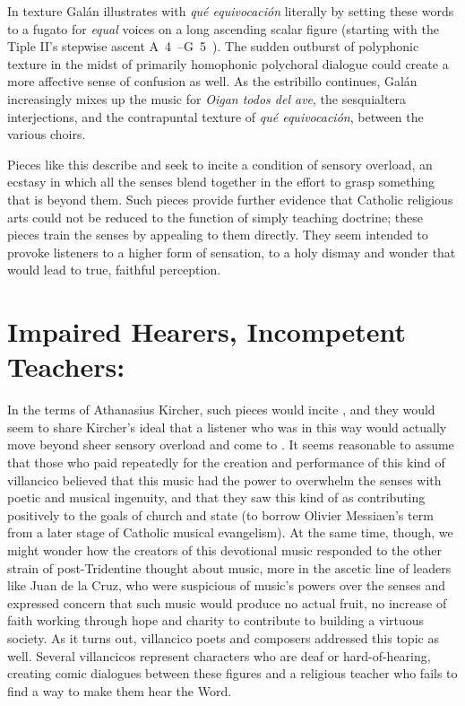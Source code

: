 \label{fig:Galan-Oigan-coloratio}
In texture Galán illustrates with \emph{qué equivocación} literally by setting these words to a fugato for \emph{equal} voices on a long ascending scalar figure (starting with the Tiple II's stepwise ascent A~4~--G~5~).
The sudden outburst of polyphonic texture in the midst of primarily homophonic polychoral dialogue could create a more affective sense of confusion as well.
As the estribillo continues, Galán increasingly mixes up the music for \emph{Oigan todos del ave}, the sesquialtera interjections, and the contrapuntal texture of \emph{qué equivocación}, between the various choirs.

Pieces like this describe and seek to incite a condition of sensory overload, an ecstasy in which all the senses blend together in the effort to grasp something that is beyond them.
Such pieces provide further evidence that Catholic religious arts could not be reduced to the function of simply teaching doctrine; these pieces train the senses by appealing to them directly.
They seem intended to provoke listeners to a higher form of sensation, to a holy dismay and wonder that would lead to true, faithful perception.


\section{Impaired Hearers, Incompetent Teachers: }

In the terms of Athanasius Kircher, such pieces would incite , and they would seem to share Kircher's ideal that a listener who was  in this way would actually move beyond sheer sensory overload and come to .
\Autocite[bk.~7, p.~550]{Kircher:Musurgia}  It seems reasonable to assume that those who paid repeatedly for the creation and performance of this kind of villancico believed that this music had the power to overwhelm the senses with poetic and musical ingenuity, and that they saw this kind of  as contributing positively to the goals of church and state (to borrow Olivier Messiaen's term from a later stage of Catholic musical evangelism).
At the same time, though, we might wonder how the creators of this devotional music responded to the other strain of post-Tridentine thought about music, more in the ascetic line of leaders like Juan de la Cruz, who were suspicious of music's powers over the senses and expressed concern that such music would produce no actual fruit, no increase of faith working through hope and charity to contribute to building a virtuous society.
As it turns out, villancico poets and composers addressed this topic as well.
Several villancicos represent characters who are deaf or hard-of-hearing, creating comic dialogues between these figures and a religious teacher who fails to find a way to make them hear the Word.

